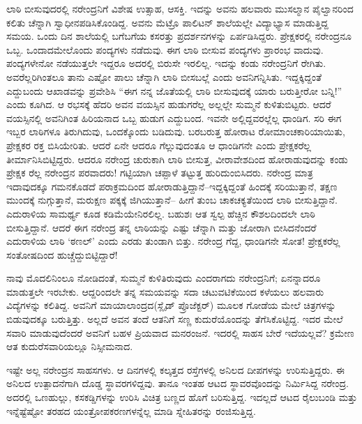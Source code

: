 ಲಾಠಿ ಬೀಸುವುದರಲ್ಲಿ ನರೇಂದ್ರನಿಗೆ ವಿಶೇಷ ಉತ್ಸಾಹ, ಆಸಕ್ತಿ. ಇದನ್ನು ಅವನು ಹಲವಾರು ಮುಸಲ್ಮಾನ ಪೈಲ್ವಾನರಿಂದ ಕಲಿತು ಚೆನ್ನಾಗಿ ಸ್ವಾಧೀನಪಡಿಸಿಕೊಂಡಿದ್ದ. ಅವನು ಮೆಟ್ರೊ ಪಾಲಿಟನ್ ಶಾಲೆಯಲ್ಲೇ ವಿದ್ಯಾಭ್ಯಾಸ ಮಾಡುತ್ತಿದ್ದ ಸಮಯ. ಒಂದು ದಿನ ಶಾಲೆಯಲ್ಲಿ ಬಗೆಬಗೆಯ ಕಸರತ್ತು ಪ್ರದರ್ಶನಗಳನ್ನು ಏರ್ಪಡಿಸಿದ್ದರು. ಪ್ರೇಕ್ಷಕರಲ್ಲಿ ನರೇಂದ್ರನೂ ಒಬ್ಬ. ಒಂದಾದಮೇಲೊಂದು ಪಂದ್ಯಗಳು ನಡೆದುವು. ಈಗ ಲಾಠಿ ಬೀಸುವ ಪಂದ್ಯಗಳು ಪ್ರಾರಂಭ ವಾದುವು. ಪಂದ್ಯಗಳೇನೋ ನಡೆಯುತ್ತಲೇ ಇದ್ದರೂ ಅದರಲ್ಲಿ ಬಿರುಸೇ ಇರಲಿಲ್ಲ. ಇದನ್ನು ಕಂಡು ನರೇಂದ್ರನಿಗೆ ರೇಗಿತು. ಅವರೆಲ್ಲರಿಗಿಂತಲೂ ತಾನು ಎಷ್ಟೋ ಪಾಲು ಚೆನ್ನಾಗಿ ಲಾಠಿ ಬೀಸಬಲ್ಲೆ ಎಂದು ಅವನಿಗನ್ನಿಸಿತು. ಇದ್ದಕ್ಕಿದ್ದಂತೆ ಎದ್ದುಬಂದು ಆಖಾಡವನ್ನು ಪ್ರವೇಶಿಸಿ “ಈಗ ನನ್ನ ಜೊತೆಯಲ್ಲಿ ಲಾಠಿ ಬೀಸುವುದಕ್ಕೆ ಯಾರು ಬರುತ್ತೀರೋ ಬನ್ನಿ!” ಎಂದು ಕೂಗಿದ. ಆ ರಭಸಕ್ಕೆ ಹೆದರಿ ಅವನ ವಯಸ್ಸಿನ ಹುಡುಗರೆಲ್ಲ ಅಲ್ಲಲ್ಲೇ ಸುಮ್ಮನೆ ಕುಳಿತುಬಿಟ್ಟರು. ಆದರೆ ವಯಸ್ಸಿನಲ್ಲಿ ಅವನಿಗಿಂತ ಹಿರಿಯನಾದ ಒಬ್ಬ ಹುಡುಗ ಎದ್ದುಬಂದ. ಇವನೇ ಅಲ್ಲಿದ್ದವರಲ್ಲೆಲ್ಲ ಧಾಂಡಿಗ. ಸರಿ ಈಗ ಇಬ್ಬರ ಲಾಠಿಗಳೂ ತಿರುಗಿದುವು, ಒಂದಕ್ಕೊಂದು ಬಡಿದುವು. ಬರಬರುತ್ತ ಹೋರಾಟ ರೋಮಾಂಚಕಾರಿಯಾಯಿತು, ಪ್ರೇಕ್ಷಕರ ರಕ್ತ ಬಿಸಿಯೇರಿತು. ಆದರೆ ಏನೇ ಆದರೂ ಗೆಲ್ಲುವುದಂತೂ ಆ ಧಾಂಡಿಗನೇ ಎಂದು ಪ್ರೇಕ್ಷಕರೆಲ್ಲ ತೀರ್ಮಾನಿಸಿಬಿಟ್ಟಿದ್ದರು. ಆದರೂ ನರೇಂದ್ರ ಚುರುಕಾಗಿ ಲಾಠಿ ಬೀಸುತ್ತ, ವೀರಾವೇಶದಿಂದ ಹೋರಾಡುವುದನ್ನು ಕಂಡು ಪ್ರೇಕ್ಷಕ ರೆಲ್ಲ ನರೇಂದ್ರನ ಪರವಾದರು! ಗಟ್ಟಿಯಾಗಿ ಚಪ್ಪಾಳೆ ತಟ್ಟುತ್ತ ಹುರಿದುಂಬಿಸಿದರು. ನರೇಂದ್ರ ಮಾತ್ರ ಇದಾವುದಕ್ಕೂ ಗಮನಕೊಡದೆ ಪರಾಕ್ರಮದಿಂದ ಹೋರಾಡುತ್ತಿದ್ದಾನೆ–ಇದ್ದಕ್ಕಿದ್ದಂತೆ ಹಿಂದಕ್ಕೆ ಸರಿಯುತ್ತಾನೆ, ತಕ್ಷಣ ಮುಂದಕ್ಕೆ ನುಗ್ಗುತ್ತಾನೆ, ಮರುಕ್ಷಣ ಪಕ್ಕಕ್ಕೆ ಜಿಗಿಯುತ್ತಾನೆ– ಹೀಗೆ ತುಂಬ ಚಾಕಚಕ್ಯತೆಯಿಂದ ಲಾಠಿ ಬೀಸುತ್ತಿದ್ದಾನೆ. ಎದುರಾಳಿಯ ಸಾಮರ್ಥ್ಯ ಕೂಡ ಕಡಿಮೆಯೇನಿರಲಿಲ್ಲ. ಬಹುಶಃ ಆತ ಸ್ವಲ್ಪ ಹೆಚ್ಚಿನ ಕೌಶಲದಿಂದಲೇ ಲಾಠಿ ಬೀಸುತ್ತಿದ್ದಾನೆ. ಆದರೆ ಈಗ ನರೇಂದ್ರ ತನ್ನ ಲಾಠಿಯನ್ನು ಎಷ್ಟು ಚೆನ್ನಾಗಿ ಮತ್ತು ಜೋರಾಗಿ ಬೀಸಿದನೆಂದರೆ ಎದುರಾಳಿಯ ಲಾಠಿ ‘ಠಣಲ್’ ಎಂದು ಎರಡು ತುಂಡಾಗಿ ಬಿತ್ತು. ನರೇಂದ್ರ ಗೆದ್ದ, ಧಾಂಡಿಗನೇ ಸೋತ! ಪ್ರೇಕ್ಷಕರೆಲ್ಲ ಸಂತೋಷದಿಂದ ಹುಚ್ಚೆದ್ದುಬಿಟ್ಟಿದ್ದಾರೆ!

ನಾವು ಮೊದಲಿನಿಂಲೂ ನೋಡಿದಂತೆ, ಸುಮ್ಮನೆ ಕುಳಿತಿರುವುದು ಎಂದರಾಗದು ನರೇಂದ್ರನಿಗೆ; ಏನನ್ನಾದರೂ ಮಾಡುತ್ತಲೇ ಇರಬೇಕು. ಆದ್ದರಿಂದಲೇ ತನ್ನ ಸಮಯವನ್ನು ಸದಾ ಚಟುವಟಿಕೆಯಿಂದ ಕಳೆಯಲು ಹಲವಾರು ವಿದ್ಯೆಗಳನ್ನು ಕಲಿತಿದ್ದ. ಅವನಿಗೆ ಮಾಯಾಲಾಂದ್ರದ(ಸ್ಲೈಡ್ ಪ್ರೊಜೆಕ್ಟರ್) ಮೂಲಕ ಗೋಡೆಯ ಮೇಲೆ ಚಿತ್ರಗಳನ್ನು ಬಿಡುವುದಕ್ಕೂ ಬರುತ್ತಿತ್ತು. ಅಲ್ಲದೆ ಅವನ ತಂದೆ ಆತನಿಗೆ ಸಣ್ಣ ಕುದುರೆಯೊಂದನ್ನು ತೆಗೆಸಿಕೊಟ್ಟಿದ್ದ. ಇದರ ಮೇಲೆ ಸವಾರಿ ಮಾಡುವುದೆಂದರೆ ಅವನಿಗೆ ಬಹಳ ಪ್ರಿಯವಾದ ಮನರಂಜನೆ. ಇದರಲ್ಲಿ ಸಾಹಸ ಬೇರೆ ಇದೆಯಲ್ಲವೆ? ಕ್ರಮೇಣ ಆತ ಕುದುರೆಸವಾರಿಯಲ್ಲೂ ನಿಸ್ಸೀಮನಾದ.

ಇಷ್ಟೇ ಅಲ್ಲ ನರೇಂದ್ರನ ಸಾಹಸಗಳು. ಆ ದಿನಗಳಲ್ಲಿ ಕಲ್ಕತ್ತದ ರಸ್ತೆಗಳಲ್ಲಿ ಅನಿಲದ ದೀಪಗಳನ್ನು ಉರಿಸುತ್ತಿದ್ದರು. ಈ ಅನಿಲದ ಉತ್ಪಾದನೆಗಾಗಿ ದೊಡ್ಡ ಸ್ಥಾವರಗಳಿದ್ದವು. ತಾನೂ ಇಂತಹ ಆಟದ ಸ್ಥಾವರವೊಂದನ್ನು ನಿರ್ಮಿಸಿದ್ದ ನರೇಂದ್ರ. ಅದರಲ್ಲಿ ಒಣಹುಲ್ಲು, ಕಸಕಡ್ಡಿಗಳನ್ನು ಉರಿಸಿ ವಿಚಿತ್ರ ಬಣ್ಣದ ಹೊಗೆ ಬರಿಸುತ್ತಿದ್ದ. ಇದಲ್ಲದೆ ಆಟದ ರೈಲುಬಂಡಿ ಮತ್ತು ಇನ್ನೆಷ್ಟೆಷ್ಟೋ ತರಹದ ಯಂತ್ರೋಪಕರಣಗಳನ್ನೆಲ್ಲ ಮಾಡಿ ಸ್ನೇಹಿತರನ್ನು ರಂಜಿಸುತ್ತಿದ್ದ.

